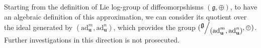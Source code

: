 

Starting from the definition of Lie log-group of diffeomorpshisms $(\mathfrak{g} , \oplus)$, to have an algebraic definition of this approximation, we can consider its quotient over the ideal generated by $(\text{ad}_{\mathbf{u}}^{m}, \text{ad}_{\mathbf{u}}^{n})$, which provides the group $(\quotient{\mathfrak{g}}{(\text{ad}_{\mathbf{u}}^{m}, \text{ad}_{\mathbf{u}}^{n})}, \oplus)$. Further investigations in this direction is not prosecuted.






